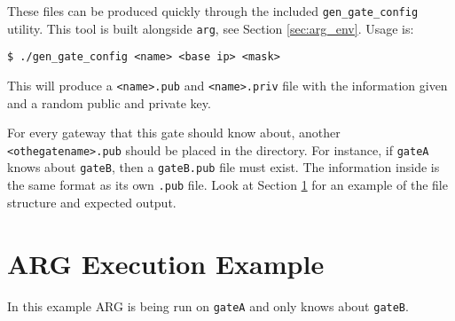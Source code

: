 \par These files can be produced quickly through the included \texttt{gen\_gate\_config} utility. This tool is built alongside \texttt{arg}, see Section \ref{sec:arg_env}. Usage is:

\begin{lstlisting}
$ ./gen_gate_config <name> <base ip> <mask>
\end{lstlisting}

\par This will produce a \texttt{<name>.pub} and \texttt{<name>.priv} file with the information given and a random public and private key.

\par For every gateway that this gate should know about, another \texttt{<othegatename>.pub} should be placed in the directory. For instance, if \texttt{gateA} knows about \texttt{gateB}, then a \texttt{gateB.pub} file must exist. The information inside is the same format as its own \texttt{.pub} file. Look at Section \ref{sec:arg_run_example} for an example of the file structure and expected output.

\section{\ac{ARG} Execution Example}
\label{sec:arg_run_example}
\par In this example \ac{ARG} is being run on \texttt{gateA} and only knows about \texttt{gateB}.

